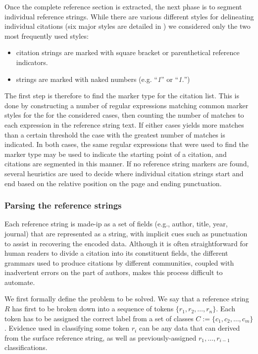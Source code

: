 Once the complete reference section is extracted, the next phase is to segment individual reference strings. While there are various different styles for delineating individual citations (six major styles are detailed in \cite{day2007}) we considered only the two most frequently used styles:
\begin{itemize}
 \item citation strings are marked with square bracket or parenthetical reference indicators.
 \item strings are marked with naked numbers (e.g. ``\emph{1}'' or ``\emph{1.}'')
\end{itemize}

The first step is therefore to find the marker type for the citation list. This is done by constructing a number of regular expressions matching common marker styles for the for the considered cases, then counting the number of matches to each expression in the reference string text. If either cases yields more matches than a certain threshold the case with the greatest number of matches is indicated. In both cases, the same regular expressions that were used to find the marker type may be used to indicate the starting point of a citation, and citations are segmented in this manner. If no reference string markers are found, several heuristics are used to decide where individual citation strings start and end based on the relative position on the page and ending punctuation.

\subsubsection{Parsing the reference strings}
Each reference string is made-ip as a set of fields (e.g., author, title, year, journal) that are represented as a string, with implicit cues such as punctuation to assist in recovering the encoded data. Although it is often straightforward for human readers to divide a citation into its constituent fields, the different grammars used to produce citations by different communities, coupled with inadvertent errors on the part of authors, makes this process difficult to automate.

We first formally define the problem to be solved. We say that a reference string $R$ has first to be broken down into a sequence of tokens $\{r_1, r_2, \ldots, r_n \}$. Each token has to be assigned the correct label from a set of classes $C:=\{c_1, c_2, \ldots, c_m\}$. Evidence used in classifying some token $r_i$ can be any data that can derived from the surface reference string, as well as previously-assigned $r_1, \ldots, r_{i-1}$ classifications.

